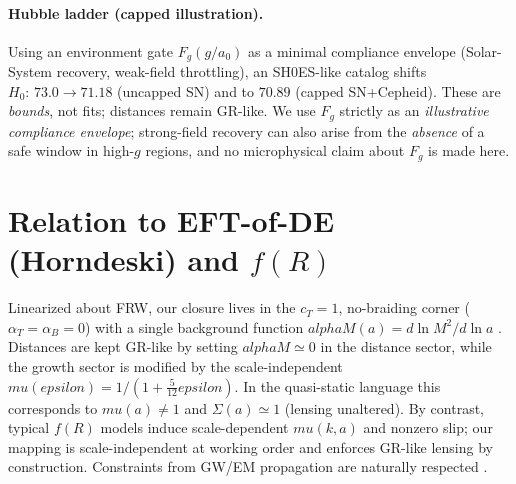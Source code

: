 \documentclass[aps,prd,onecolumn,superscriptaddress,nofootinbib]{revtex4-2}
\def\alphaM{alphaM}%
\def\eps{epsilon}%
\def\mu{mu}%
\def\alpha{alpha}%
\def\alpha_M{alphaM}%
\providecommand{\alphaM}{\alpha_M}
\providecommand{\eps}{\varepsilon}
\begin{document}
\paragraph{Hubble ladder (capped illustration).} Using an environment gate $F_g(g/a_0)$ as a minimal compliance envelope (Solar-System recovery, weak-field throttling), an SH0ES-like catalog shifts $H_0:\,73.0\to 71.18$ (uncapped SN) and to $70.89$ (capped SN+Cepheid). These are \emph{bounds}, not fits; distances remain GR-like. We use $F_g$ strictly as an \emph{illustrative compliance envelope}; strong-field recovery can also arise from the \emph{absence} of a safe window in high-$g$ regions, and no microphysical claim about $F_g$ is made here.

\section{Relation to EFT-of-DE (Horndeski) and \texorpdfstring{$f(R)$}{f(R)}}
\label{sec:eft}
Linearized about FRW, our closure lives in the $c_T=1$, no-braiding corner ($\alpha_T=\alpha_B=0$) with a single background function $\alphaM(a)=d\ln M^2/d\ln a$ \cite{BelliniSawicki2014}. Distances are kept GR-like by setting $\alphaM\simeq 0$ in the distance sector, while the growth sector is modified by the scale-independent $\mu(\eps)=1/(1+\tfrac{5}{12}\eps)$. In the quasi-static language this corresponds to $\mu(a)\neq 1$ and $\Sigma(a)\simeq 1$ (lensing unaltered). By contrast, typical $f(R)$ models induce scale-dependent $\mu(k,a)$ and nonzero slip; our mapping is scale-independent at working order and enforces GR-like lensing by construction. Constraints from GW/EM propagation are naturally respected \cite{LombriserTaylor2016}.

\end{document}
